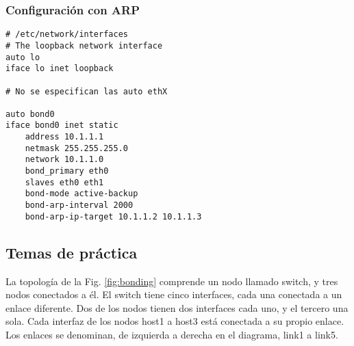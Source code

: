 \subsubsection {Configuración con ARP}

\begin{lstlisting}
# /etc/network/interfaces
# The loopback network interface
auto lo
iface lo inet loopback

# No se especifican las auto ethX

auto bond0
iface bond0 inet static
	address 10.1.1.1
	netmask 255.255.255.0
	network 10.1.1.0
	bond_primary eth0
	slaves eth0 eth1
	bond-mode active-backup
	bond-arp-interval 2000
	bond-arp-ip-target 10.1.1.2 10.1.1.3

\end{lstlisting}



\subsection{Temas de práctica}

La topología de la Fig. \ref{fig:bonding} comprende un nodo llamado switch, y tres nodos conectados a él. El switch tiene cinco interfaces, cada una conectada a un enlace diferente. Dos de los nodos tienen dos interfaces cada uno, y el tercero una sola. Cada interfaz de los nodos host1 a host3 está conectada a su propio enlace. Los enlaces se denominan, de izquierda a derecha en el diagrama, link1 a link5. 




